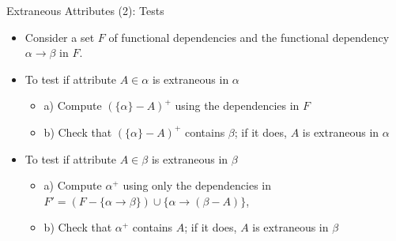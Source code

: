 \documentclass[aspectratio=169, xcolor=dvipsnames]{beamer}
\begin{document}
\begin{frame}{Extraneous Attributes (2): Tests}
    \begin{itemize}[<+->]
        \item Consider a set $F$ of functional dependencies and the functional dependency $\alpha \rightarrow \beta$ in $F$.
        \item To test if attribute $A \in \alpha$ is extraneous in $\alpha$
        \begin{itemize}
            \item[$\triangleright$] a) Compute $(\{\alpha\} - A)^+$ using the dependencies in $F$
            \item[$\triangleright$] b) Check that $(\{\alpha\} - A)^+$ contains $\beta$; if it does, $A$ is extraneous in $\alpha$
        \end{itemize}
        \item To test if attribute $A \in \beta$ is extraneous in $\beta$
        \begin{itemize}
            \item[$\triangleright$] a) Compute $\alpha^+$ using only the dependencies in $F' = (F - \{\alpha \rightarrow \beta\}) \cup \{\alpha \rightarrow (\beta - A)\}$,
            \item[$\triangleright$] b) Check that $\alpha^+$ contains $A$; if it does, $A$ is extraneous in $\beta$
        \end{itemize}
    \end{itemize}
\end{frame}
\end{document}
